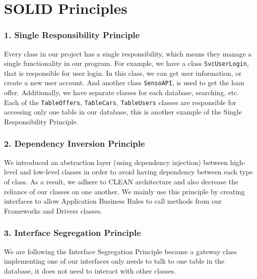 \documentclass[fontsize=14pt]{article}
\def\code#1{\texttt{#1}}
\begin{document}


\section*{SOLID Principles} 

\subsubsection*{1. Single Responsibility Principle}

Every class in our project has a single responsibility, which means they manage a single functionality in our program. For example, we have a class \texttt{SvcUserLogin}, that is responsible for user login. In this class, we can get user information, or create a new user account. And another class \texttt{SensoAPI}, is used to get the loan offer. Additionally, we have separate classes for each database, searching, etc. Each of the \code{TableOffers}, \code{TableCars}, \code{TableUsers} classes are responsible for accessing only one table in our database, this is another example of the Single Responsibility Principle.

\subsubsection*{2. Dependency Inversion Principle}

We introduced an abstraction layer (using dependency injection) between high-level and low-level classes in order to avoid having dependency between each type of class. As a result, we adhere to CLEAN architecture and also decrease the reliance of our classes on one another. We mainly use this principle by creating interfaces to allow Application Business Rules to call methods from our Frameworks and Drivers classes.

\subsubsection*{3. Interface Segregation Principle} 
We are following the Interface Segregation Principle because a gateway class implementing one of our interfaces only needs to talk to one table in the database, it does not need to interact with other classes.
\end{document}
